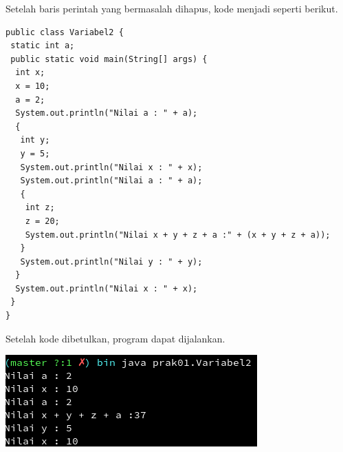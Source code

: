 \documentclass[a4paper,12pt]{article}
\begin{document}
Setelah baris perintah yang bermasalah dihapus, kode menjadi seperti berikut.
\begin{lstlisting}
public class Variabel2 {
 static int a;
 public static void main(String[] args) {
  int x;
  x = 10;
  a = 2;
  System.out.println("Nilai a : " + a);
  {
   int y;
   y = 5;
   System.out.println("Nilai x : " + x);
   System.out.println("Nilai a : " + a);
   {
    int z;
    z = 20;
    System.out.println("Nilai x + y + z + a :" + (x + y + z + a));
   }
   System.out.println("Nilai y : " + y);
  }
  System.out.println("Nilai x : " + x);
 }
}
\end{lstlisting}

Setelah kode dibetulkan, program dapat dijalankan.

\begin{center}
    \includegraphics[width=\textwidth]{7.png} 
\end{center}
\end{document}

